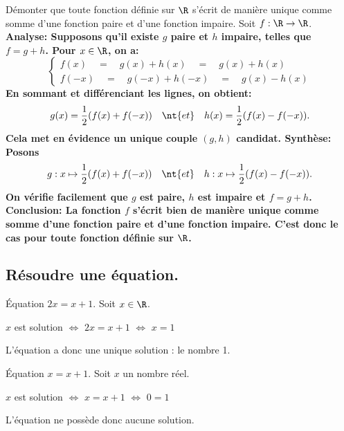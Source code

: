 \documentclass[11pt]{article}
\begin{document}
\begin{ex}{}{}
    Démonter que toute fonction définie sur $\R$ s'écrit de manière unique comme somme d'une fonction paire et d'une fonction impaire.
    \tcblower
    Soit $f:\R\to\R$.\\
    \bf{Analyse:} Supposons qu'il existe $g$ paire et $h$ impaire, telles que $f=g+h$. Pour $x\in\R$, on a:
    \begin{equation*}
        \begin{cases}
            f(x)\quad=\quad g(x)+h(x)\quad=\quad g(x)+h(x)\\
            f(-x)\quad=\quad g(-x)+h(-x)\quad=\quad g(x)-h(x)
        \end{cases}
    \end{equation*}
    En sommant et différenciant les lignes, on obtient:
    \begin{equation*}
        g(x)=\frac{1}{2}(f(x)+f(-x))\quad\nt{et}\quad h(x)=\frac{1}{2}(f(x)-f(-x)).
    \end{equation*}
    Cela met en évidence un unique couple $(g,h)$ candidat.\n
    \bf{Synthèse:} Posons
    \begin{equation*}
        g:x\mapsto\frac{1}{2}(f(x)+f(-x))\quad\nt{et}\quad h:x\mapsto\frac{1}{2}(f(x)-f(-x)).
    \end{equation*}
    On vérifie facilement que $g$ est paire, $h$ est impaire et $f=g+h$.\n
    \bf{Conclusion:} La fonction $f$ s'écrit bien de manière unique comme somme d'une fonction paire et d'une fonction impaire. C'est donc le cas pour toute fonction définie sur $\R$.
\end{ex}

\subsection{Résoudre une équation.}

\begin{ex}{Équation $2x=x+1$.}{}
    Soit $x\in\R$.
    \begin{center}
        $x$ est solution $\iff$ $2x=x+1$ $\iff$ $x=1$
    \end{center}
    L'équation a donc une unique solution : le nombre 1.
\end{ex}

\begin{ex}{Équation $x=x+1$.}{}
    Soit $x$ un nombre réel.
    \begin{center}
        $x$ est solution $\iff$ $x=x+1$ $\iff$ $0=1$
    \end{center}
    L'équation ne possède donc aucune solution.
\end{ex}
\end{document}
